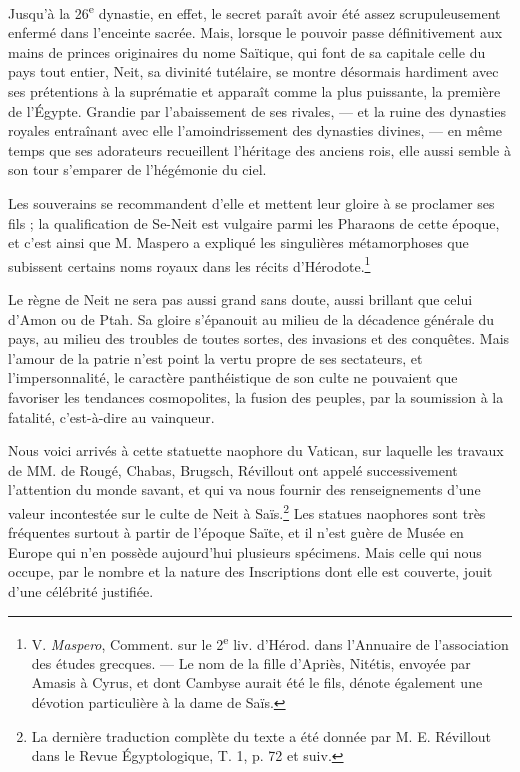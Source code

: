 \documentclass[letterpaper,twocolumn,openany,nodeprecatedcode]{dndbook}
\begin{document}
Jusqu'à la 26\textsuperscript{e} dynastie, en effet, le secret paraît avoir été assez scrupuleusement enfermé dans l'enceinte sacrée. Mais, lorsque le pouvoir passe définitivement aux mains de princes originaires du nome Saïtique, qui font de sa capitale celle du pays tout entier, Neit, sa divinité tutélaire, se montre désormais hardiment avec ses prétentions à la suprématie et apparaît comme la plus puissante, la première de l'Égypte. Grandie par l'abaissement de ses rivales, --- et la ruine des dynasties royales entraînant avec elle l'amoindrissement des dynasties divines, --- en même temps que ses adorateurs recueillent l'héritage des anciens rois, elle aussi semble à son tour s'emparer de l'hégémonie du ciel.

Les souverains se recommandent d'elle et mettent leur gloire à se proclamer ses fils ; la qualification de Se-Neit est vulgaire parmi les Pharaons de cette époque, et c'est ainsi que M. Maspero a expliqué les singulières métamorphoses que subissent certains noms royaux dans les récits d'Hérodote.\footnote{V. \emph{Maspero}, Comment. sur le 2\textsuperscript{e} liv. d'Hérod. dans l'Annuaire de l'association des études grecques. --- Le nom de la fille d'Apriès, Nitétis, envoyée par Amasis à Cyrus, et dont Cambyse aurait été le fils, dénote également une dévotion particulière à la dame de Saïs.}

Le règne de Neit ne sera pas aussi grand sans doute, aussi brillant que celui d'Amon ou de Ptah. Sa gloire s'épanouit au milieu de la décadence générale du pays, au milieu des troubles de toutes sortes, des invasions et des conquêtes. Mais l'amour de la patrie n'est point la vertu propre de ses sectateurs, et l'impersonnalité, le caractère panthéistique de son culte ne pouvaient que favoriser les tendances cosmopolites, la fusion des peuples, par la soumission à la fatalité, c'est-à-dire au vainqueur.

Nous voici arrivés à cette statuette naophore du Vatican, sur laquelle les travaux de MM. de Rougé, Chabas, Brugsch, Révillout ont appelé successivement l'attention du monde savant, et qui va nous fournir des renseignements d'une valeur incontestée sur le culte de Neit à Saïs.\footnote{La dernière traduction complète du texte a été donnée par M. E. Révillout dans le Revue Égyptologique, T. 1, p. 72 et suiv.} Les statues naophores sont très fréquentes surtout à partir de l'époque Saïte, et il n'est guère de Musée en Europe qui n'en possède aujourd'hui plusieurs spécimens. Mais celle qui nous occupe, par le nombre et la nature des Inscriptions dont elle est couverte, jouit d'une célébrité justifiée.
\end{document}
